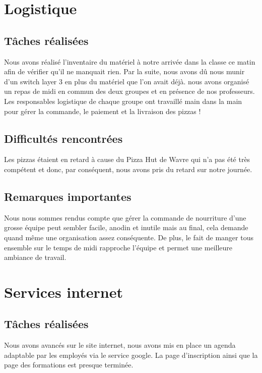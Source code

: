 \documentclass{article}
\begin{document}
    
   
\section{Logistique}
    \subsection{Tâches réalisées}
        Nous avons réalisé l'inventaire du matériel à notre arrivée dans la classe ce matin afin de vérifier qu'il ne manquait rien. Par la suite, nous avons dû nous munir d'un switch layer 3 en plus du matériel que l'on avait déjà. nous avons organisé un repas de midi en commun des deux groupes et en présence de nos professeurs. Les responsables logistique de chaque groupe ont travaillé main dans la main pour gérer la commande, le paiement et la livraison des pizzas ! 
        
    \subsection{Difficultés rencontrées}
        Les pizzas étaient en retard à cause du Pizza Hut de Wavre qui n'a pas été très compétent et donc, par conséquent, nous avons pris du retard sur notre journée.
        
    \subsection{Remarques importantes}
    
        Nous nous sommes rendus compte que gérer la commande de nourriture d'une grosse équipe peut sembler facile, anodin et inutile mais au final, cela demande quand même une organisation assez conséquente. De plus, le fait de manger tous ensemble sur le temps de midi rapproche l'équipe et permet une meilleure ambiance de travail. 
    
\section{Services internet}
    \subsection{Tâches réalisées} 
        Nous avons avancés sur le site internet, nous avons mis en place un agenda adaptable par les employés via le service google. La page d'inscription ainsi que la page des formations est presque terminée.
\end{document}
